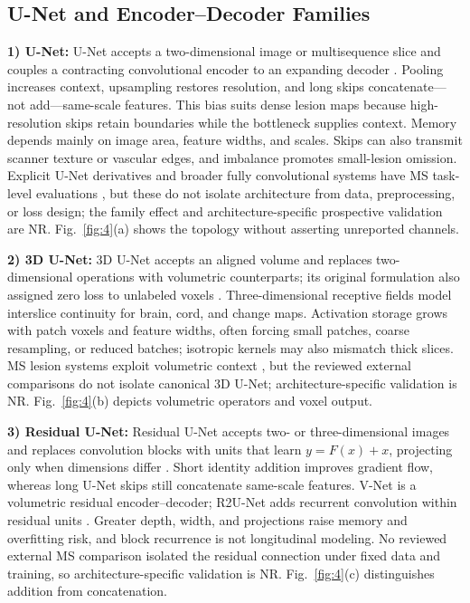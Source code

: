 \documentclass[journal,twoside,web]{ieeecolor}
\begin{document}
\subsection{U-Net and Encoder--Decoder Families}\label{subsec:u-net-and-encoder-decoder-families}

\textbf{1) U-Net:} U-Net accepts a two-dimensional image or multisequence slice and couples a contracting convolutional encoder to an expanding decoder \cite{unet}. Pooling increases context, upsampling restores resolution, and long skips concatenate---not add---same-scale features. This bias suits dense lesion maps because high-resolution skips retain boundaries while the bottleneck supplies context. Memory depends mainly on image area, feature widths, and scales. Skips can also transmit scanner texture or vascular edges, and imbalance promotes small-lesion omission. Explicit U-Net derivatives and broader fully convolutional systems have MS task-level evaluations \cite{multiarm,gabr,chaves}, but these do not isolate architecture from data, preprocessing, or loss design; the family effect and architecture-specific prospective validation are NR. Fig.~\ref{fig:4}(a) shows the topology without asserting unreported channels.


\textbf{2) 3D U-Net:} 3D U-Net accepts an aligned volume and replaces two-dimensional operations with volumetric counterparts; its original formulation also assigned zero loss to unlabeled voxels \cite{unet3d}. Three-dimensional receptive fields model interslice continuity for brain, cord, and change maps. Activation storage grows with patch voxels and feature widths, often forcing small patches, coarse resampling, or reduced batches; isotropic kernels may also mismatch thick slices. MS lesion systems exploit volumetric context \cite{mckinley}, but the reviewed external comparisons do not isolate canonical 3D U-Net; architecture-specific validation is NR. Fig.~\ref{fig:4}(b) depicts volumetric operators and voxel output.


\textbf{3) Residual U-Net:} Residual U-Net accepts two- or three-dimensional images and replaces convolution blocks with units that learn $y=F(x)+x$, projecting only when dimensions differ \cite{resnet}. Short identity addition improves gradient flow, whereas long U-Net skips still concatenate same-scale features. V-Net is a volumetric residual encoder--decoder; R2U-Net adds recurrent convolution within residual units \cite{vnet,r2unet}. Greater depth, width, and projections raise memory and overfitting risk, and block recurrence is not longitudinal modeling. No reviewed external MS comparison isolated the residual connection under fixed data and training, so architecture-specific validation is NR. Fig.~\ref{fig:4}(c) distinguishes addition from concatenation.
\end{document}
